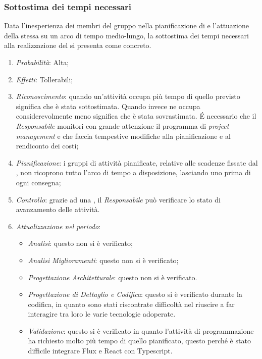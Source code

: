 \subsubsection{Sottostima dei tempi necessari}
Data l'inesperienza dei membri del gruppo nella pianificazione di  e l'attuazione della stessa su un arco di tempo medio-lungo, la sottostima dei tempi necessari alla realizzazione del  si presenta come  concreto.
\begin{enumerate}
\item \textit{Probabilit\`a}: Alta;
\item \textit{Effetti}: Tollerabili;
\item \textit{Riconoscimento}: quando un’attività occupa più tempo di quello previsto significa che è stata sottostimata. Quando invece ne occupa considerevolmente meno significa che è stata sovrastimata. É necessario che il \textit{Responsabile} monitori con grande attenzione il programma di \textit{project management} e che faccia tempestive modifiche alla pianificazione e al rendiconto dei costi;
\item \textit{Pianificazione}: i gruppi di attivit\`a pianificate, relative alle scadenze fissate dal , non ricoprono tutto l'arco di tempo a disposizione, lasciando uno  prima di ogni consegna;
\item \textit{Controllo}: grazie ad una , il \textit{Responsabile} pu\`o verificare lo stato di avanzamento delle attivit\`a.
\item \textit{Attualizzazione nel periodo}: 
	\begin{itemize}
	\item \textit{Analisi}: questo  non si è verificato;
	\item \textit{Analisi Miglioramenti}: questo  non si è verificato;
	\item \textit{Progettazione Architetturale}: questo  non si è verificato.
	\item \textit{Progettazione di Dettaglio e Codifica}: questo  si \`e verificato durante la codifica, in quanto sono stati riscontrate difficolt\`a nel riuscire a far interagire tra loro le varie tecnologie adoperate.
	\item \textit{Validazione}: questo  si \`e verificato in quanto l'attivit\`a di programmazione ha richiesto molto più tempo di quello pianificato, questo perché è stato difficile integrare Flux e React con Typescript.
	\end{itemize}
\end{enumerate}

